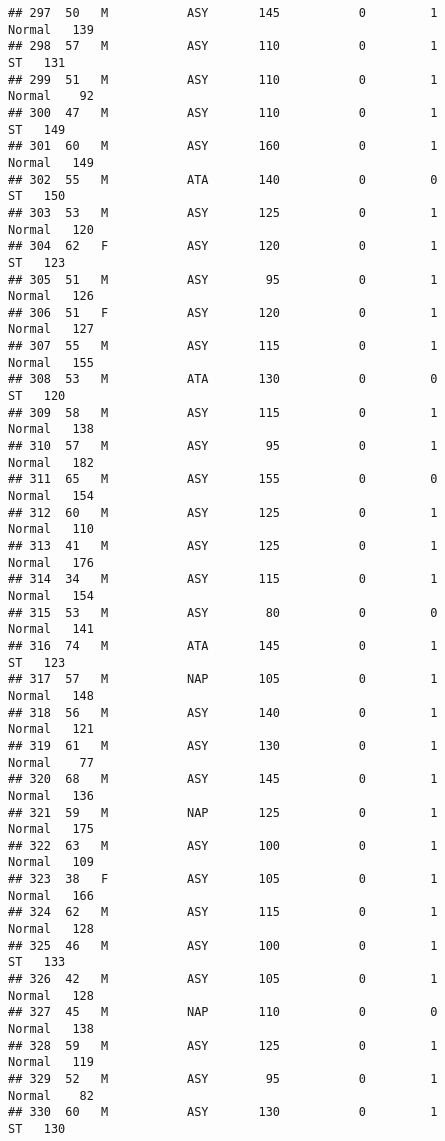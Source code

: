 \documentclass[
]{article}
\begin{document}
\begin{verbatim}
## 297  50   M           ASY       145           0         1     Normal   139
## 298  57   M           ASY       110           0         1         ST   131
## 299  51   M           ASY       110           0         1     Normal    92
## 300  47   M           ASY       110           0         1         ST   149
## 301  60   M           ASY       160           0         1     Normal   149
## 302  55   M           ATA       140           0         0         ST   150
## 303  53   M           ASY       125           0         1     Normal   120
## 304  62   F           ASY       120           0         1         ST   123
## 305  51   M           ASY        95           0         1     Normal   126
## 306  51   F           ASY       120           0         1     Normal   127
## 307  55   M           ASY       115           0         1     Normal   155
## 308  53   M           ATA       130           0         0         ST   120
## 309  58   M           ASY       115           0         1     Normal   138
## 310  57   M           ASY        95           0         1     Normal   182
## 311  65   M           ASY       155           0         0     Normal   154
## 312  60   M           ASY       125           0         1     Normal   110
## 313  41   M           ASY       125           0         1     Normal   176
## 314  34   M           ASY       115           0         1     Normal   154
## 315  53   M           ASY        80           0         0     Normal   141
## 316  74   M           ATA       145           0         1         ST   123
## 317  57   M           NAP       105           0         1     Normal   148
## 318  56   M           ASY       140           0         1     Normal   121
## 319  61   M           ASY       130           0         1     Normal    77
## 320  68   M           ASY       145           0         1     Normal   136
## 321  59   M           NAP       125           0         1     Normal   175
## 322  63   M           ASY       100           0         1     Normal   109
## 323  38   F           ASY       105           0         1     Normal   166
## 324  62   M           ASY       115           0         1     Normal   128
## 325  46   M           ASY       100           0         1         ST   133
## 326  42   M           ASY       105           0         1     Normal   128
## 327  45   M           NAP       110           0         0     Normal   138
## 328  59   M           ASY       125           0         1     Normal   119
## 329  52   M           ASY        95           0         1     Normal    82
## 330  60   M           ASY       130           0         1         ST   130

\end{verbatim}
\end{document}
